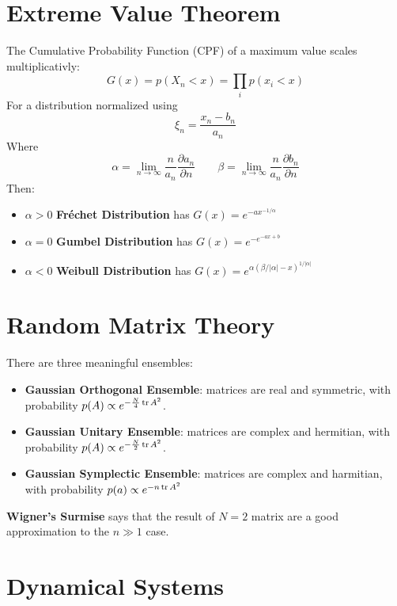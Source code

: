 \documentclass[twocolumn]{article}
\begin{document}
\section{Extreme Value Theorem}
The Cumulative Probability Function (CPF) of a maximum value scales multiplicativly:
\begin{equation}
    G(x) = p(X_n < x) = \prod_i p(x_i < x)
\end{equation}
For a distribution normalized using
\begin{equation}
    \xi_n = \frac{x_n - b_n}{a_n}
\end{equation}
Where
\begin{equation}
    \alpha = \lim_{n\rightarrow\infty} \frac{n}{a_n}\frac{\partial a_n}{\partial n}
    \qquad
    \beta = \lim_{n\rightarrow\infty} \frac{n}{a_n}\frac{\partial b_n}{\partial n}
\end{equation}
Then:
\begin{itemize}
    \item $\alpha > 0$ \textbf{Fréchet Distribution} has $G(x) = e^{-ax^{-1/\alpha}}$
    \item $\alpha = 0$ \textbf{Gumbel Distribution} has $G(x) = e^{-e^{-ax + b}}$
    \item $\alpha < 0$ \textbf{Weibull Distribution} has $G(x) = e^{\alpha(\beta/|\alpha| - x)^{1/|\alpha|}}$
\end{itemize}
\section{Random Matrix Theory}
There are three meaningful ensembles:
\begin{itemize}
    \item \textbf{Gaussian Orthogonal Ensemble}: matrices are real and symmetric, with probability $p(A) \propto e^{-\frac{N}{4}\tr A^2}$.
    \item \textbf{Gaussian Unitary Ensemble}: matrices are complex and hermitian, with probability $p(A) \propto e^{-\frac{N}{2}\tr A^2}$.
    \item \textbf{Gaussian Symplectic Ensemble}: matrices are complex and harmitian, with probability $p(a) \propto e^{-n\tr A^2}$
\end{itemize}
\textbf{Wigner's Surmise} says that the result of $N=2$ matrix are a good approximation to the $n \gg 1$ case.
\section{Dynamical Systems}
\end{document}
